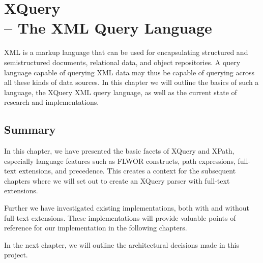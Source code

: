 \chapter[XQuery -- The XML Query Language]{XQuery \\ \huge-- The XML Query Language}
\label{chapter:theory}
XML is a markup language that can be used for encapsulating structured and
semistructured documents, relational data, and object repositories. A query
language capable of querying XML data may thus be capable of querying across
all these kinds of data sources. In this chapter we will outline the basics of
such a language, the XQuery XML query language, as well as the current state of
research and implementations. 




\section{Summary}
In this chapter, we have presented the basic facets of XQuery and XPath,
especially language features such as FLWOR constructs, path expressions, 
full-text extensions, and precedence. This creates a context for the subsequent
chapters where we will set out to create an XQuery parser with full-text
extensions. 

Further we have investigated existing implementations, both with and without
full-text extensions. These implementations will provide valuable points of
reference for our implementation in the following chapters.

In the next chapter, we will outline the architectural decisions made in this
project.